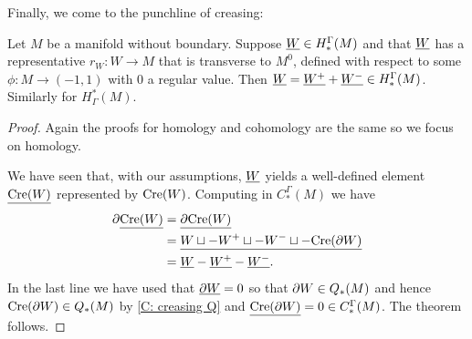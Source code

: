 Finally, we come to the punchline of creasing:

\begin{theorem}\label{T: cohomology creasing}
Let $M$ be a manifold without boundary. Suppose $\underline{W} \in H_*^\Gamma(M)$ and that $\underline{W}$ has a representative $r_W \colon W \to M$ that is transverse to $M^0$, defined with respect to some $\phi:M \to (-1,1)$ with $0$ a regular value.
Then $\underline{W} = \underline{W^+}+\underline{W^-} \in H_*^\Gamma(M)$. Similarly for $H^*_\Gamma(M)$.
\end{theorem}
\begin{proof}
Again the proofs for homology and cohomology are the same so we focus on homology.

We have seen that, with our assumptions, $\underline{W}$ yields a well-defined element $\underline{\mathrm{Cre}(W)}$ represented by $\mathrm{Cre}(W)$. Computing in $C_*^\Gamma(M)$ we have
\begin{align*}
\partial \underline{\mathrm{Cre}(W)}& = \underline{\partial \mathrm{Cre}(W) }\\
& = \underline{W\sqcup -W^+\sqcup -W^-\sqcup -\mathrm{Cre}(\partial W)}\\
& = \underline{W} -\underline{W^+}-\underline{W^-}.
\end{align*}
In the last line we have used that $\underline{\partial W} = 0$ so that $\partial W \in Q_*(M)$ and hence $\mathrm{Cre}(\partial W) \in Q_*(M)$ by \cref{C: creasing Q} and $\underline{\mathrm{Cre}(\partial W)} = 0 \in C_*^\Gamma(M)$.
The theorem follows.
\end{proof}

